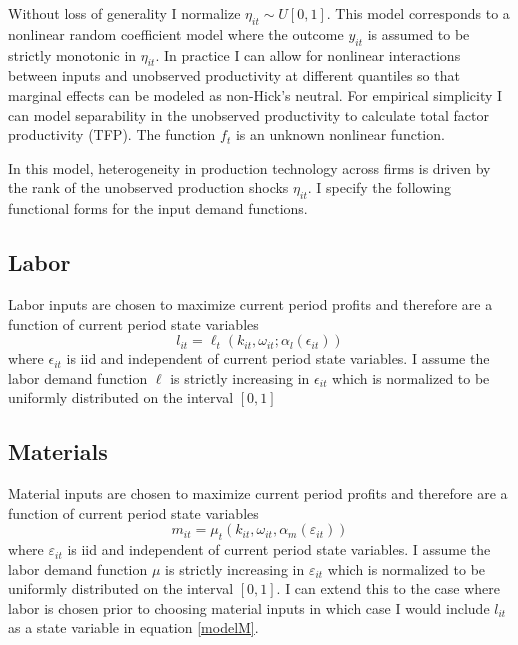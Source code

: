 \documentclass{article}
\begin{document}
Without loss of generality I normalize $\eta_{it}\sim U[0,1]$. This model corresponds to a nonlinear random coefficient model where the outcome $y_{it}$ is assumed to be strictly monotonic in $\eta_{it}$. In practice I can allow for nonlinear interactions between inputs and unobserved productivity at different quantiles so that marginal effects can be modeled as non-Hick's neutral. For empirical simplicity I can model separability in the unobserved productivity to calculate total factor productivity (TFP). The function $f_{t}$ is an unknown nonlinear function.

In this model, heterogeneity in production technology across firms is driven by the rank of the unobserved production shocks $\eta_{it}$. I specify the following functional forms for the input demand functions.

\subsection*{Labor} 
Labor inputs are chosen to maximize current period profits and therefore are a function of current period state variables
\begin{equation} \label{modelL}
l_{it}=\ell_{t}(k_{it}, \omega_{it}; \alpha_{l}(\epsilon_{it}))
\end{equation}
where $\epsilon_{it}$ is iid and independent of current period state variables. I assume the labor demand function $\ell$ is strictly increasing in $\epsilon_{it}$ which is normalized to be uniformly distributed on the interval $[0,1]$

\subsection*{Materials} 
Material inputs are chosen to maximize current period profits and therefore are a function of current period state variables
\begin{equation} \label{modelM}
m_{it}=\mu_{t}(k_{it}, \omega_{it}, \alpha_{m}(\varepsilon_{it}))
\end{equation}
where $\varepsilon_{it}$ is iid and independent of current period state variables. I assume the labor demand function $\mu$ is strictly increasing in $\varepsilon_{it}$ which is normalized to be uniformly distributed on the interval $[0,1]$. I can extend this to the case where labor is chosen prior to choosing material inputs in which case I would include $l_{it}$ as a state variable in equation \eqref{modelM}.
\end{document}
